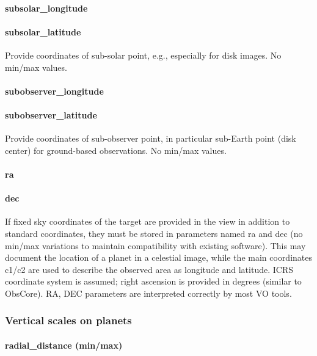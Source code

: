 \documentclass[11pt,a4paper]{ivoa}
\begin{document}
\paragraph{subsolar\_longitude}

\paragraph{subsolar\_latitude}

Provide coordinates of sub-solar point, e.g., especially for disk images. No min/max values.

\paragraph{subobserver\_longitude}

\paragraph{subobserver\_latitude}

Provide coordinates of sub-observer point, in particular sub-Earth point (disk center) for ground-based observations. No min/max values.

\paragraph{ra}

\paragraph{dec}

If fixed sky coordinates of the target are provided in the view in addition to standard coordinates, they must be stored in parameters named ra and dec (no min/max variations to maintain compatibility with existing software). This may document the location of a planet in a celestial image, while the main coordinates c1/c2 are used to describe the observed area as longitude and latitude. ICRS coordinate system is assumed; right ascension is provided in degrees (similar to ObsCore). RA, DEC parameters are interpreted correctly by most VO tools.

\subsubsection{Vertical scales on planets}

\paragraph{radial\_distance (min/max)}
\end{document}
